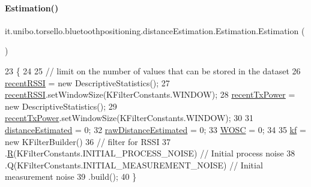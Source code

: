 \paragraph{\texorpdfstring{Estimation()}{Estimation()}}
{\footnotesize\ttfamily it.\+unibo.\+torsello.\+bluetoothpositioning.\+distance\+Estimation.\+Estimation.\+Estimation (\begin{DoxyParamCaption}{ }\end{DoxyParamCaption})}


\begin{DoxyCode}
23                         \{
24 
25         \textcolor{comment}{// limit on the number of values that can be stored in the dataset}
26         \hyperlink{classit_1_1unibo_1_1torsello_1_1bluetoothpositioning_1_1distanceEstimation_1_1Estimation_a4edd1c580372b087a9d8fc167715088a_a4edd1c580372b087a9d8fc167715088a}{recentRSSI} = \textcolor{keyword}{new} DescriptiveStatistics();
27         \hyperlink{classit_1_1unibo_1_1torsello_1_1bluetoothpositioning_1_1distanceEstimation_1_1Estimation_a4edd1c580372b087a9d8fc167715088a_a4edd1c580372b087a9d8fc167715088a}{recentRSSI}.setWindowSize(KFilterConstants.WINDOW);
28         \hyperlink{classit_1_1unibo_1_1torsello_1_1bluetoothpositioning_1_1distanceEstimation_1_1Estimation_a4258d96e807fa104223635ecb7ddc940_a4258d96e807fa104223635ecb7ddc940}{recentTxPower} = \textcolor{keyword}{new} DescriptiveStatistics();
29         \hyperlink{classit_1_1unibo_1_1torsello_1_1bluetoothpositioning_1_1distanceEstimation_1_1Estimation_a4258d96e807fa104223635ecb7ddc940_a4258d96e807fa104223635ecb7ddc940}{recentTxPower}.setWindowSize(KFilterConstants.WINDOW);
30 
31         \hyperlink{classit_1_1unibo_1_1torsello_1_1bluetoothpositioning_1_1distanceEstimation_1_1Estimation_a7a5514b25ac6495842a53e54319be10d_a7a5514b25ac6495842a53e54319be10d}{distanceEstimated} = 0;
32         \hyperlink{classit_1_1unibo_1_1torsello_1_1bluetoothpositioning_1_1distanceEstimation_1_1Estimation_a5afcd0b9b73a92b64669f060206f35db_a5afcd0b9b73a92b64669f060206f35db}{rawDistanceEstimated} = 0;
33         \hyperlink{classit_1_1unibo_1_1torsello_1_1bluetoothpositioning_1_1distanceEstimation_1_1Estimation_a53237b14bc1d27ae4f751b02d798b595_a53237b14bc1d27ae4f751b02d798b595}{WOSC} = 0;
34 
35         \hyperlink{classit_1_1unibo_1_1torsello_1_1bluetoothpositioning_1_1distanceEstimation_1_1Estimation_a93af801219b710f3a048e7db1c7a8982_a93af801219b710f3a048e7db1c7a8982}{kf} = \textcolor{keyword}{new} KFilterBuilder()
36                 \textcolor{comment}{// filter for RSSI}
37                 .\hyperlink{classit_1_1unibo_1_1torsello_1_1bluetoothpositioning_1_1kalmanFilter_1_1KFilter_a8dd220ba0a0b0f20c368b13efeb1fe43_a8dd220ba0a0b0f20c368b13efeb1fe43}{R}(KFilterConstants.INITIAL\_PROCESS\_NOISE) \textcolor{comment}{// Initial process noise}
38                 .Q(KFilterConstants.INITIAL\_MEASUREMENT\_NOISE) \textcolor{comment}{// Initial measurement noise}
39                 .build();
40     \}
\end{DoxyCode}



